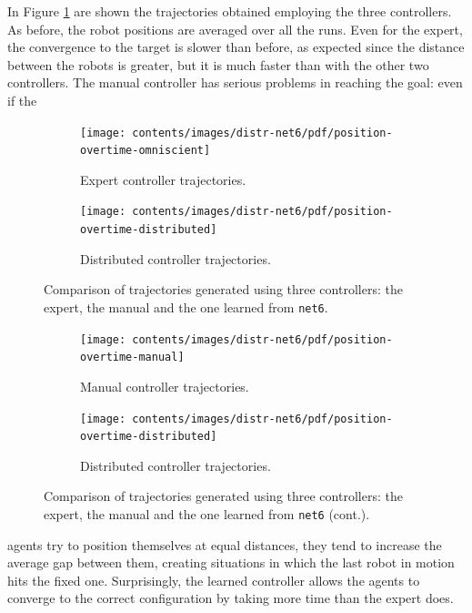 In Figure \ref{fig:net6traj} are shown the trajectories obtained employing the 
three controllers. 
As before, the robot positions are averaged over all the runs. 
Even for the expert, the convergence to the target is slower than before, 
as expected since the distance between the robots is greater, but it is much faster 
than with the other two controllers.
The manual controller has serious problems in reaching the goal: even if the 
\begin{figure}[!htb]
	\begin{center}
		\begin{subfigure}[h]{0.49\textwidth}
			\centering
			\texttt{[image: contents/images/distr-net6/pdf/position-overtime-omniscient]}%
			\caption{Expert controller trajectories.}
		\end{subfigure}
		\hfill
		\begin{subfigure}[h]{0.49\textwidth}
			\centering
			\texttt{[image: contents/images/distr-net6/pdf/position-overtime-distributed]}
			\caption{Distributed controller trajectories.}
		\end{subfigure}
	\end{center}
	\caption[Evaluation of the trajectories learned by 
	\texttt{net6}.]{Comparison of trajectories generated using three 
		controllers: the expert, the manual and the one learned from \texttt{net6}.}
\end{figure}
\medskip
\begin{figure}[!htb]\ContinuedFloat
	\centering
	\begin{subfigure}[h]{0.49\textwidth}
		\centering			
		\texttt{[image: contents/images/distr-net6/pdf/position-overtime-manual]}%
		\caption{Manual controller trajectories.}
	\end{subfigure}
	\hfill
	\begin{subfigure}[h]{0.49\textwidth}
		\centering
		\texttt{[image: contents/images/distr-net6/pdf/position-overtime-distributed]}
		\caption{Distributed controller trajectories.}
	\end{subfigure}
	\caption[]{Comparison 
		of trajectories generated using three controllers: the expert, the manual 
		and the one learned from \texttt{net6} (cont.).}
	\label{fig:net6traj}
\end{figure}
\noindent
agents try to position themselves at equal distances, they tend to increase the 
average gap between them, creating situations in which the last robot in motion 
hits the fixed one. Surprisingly, the learned controller allows the agents to 
converge to the correct configuration by taking more time than the expert does.

